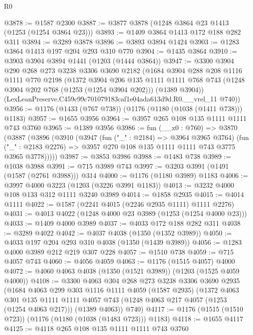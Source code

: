 \begin{lexlean}{R0}
\begin{coremodule}
@3878 := @1587 @2300
@3887 := @3877 @3878 (@1248 @3864 @23 @1413 (@1253 (@1254 @3864 @23)))
@3893 := @1409 @3864 @1413 @172 @188 @282 @311
@3894 := @3289 @3878
@3896 := @3893 @3894 @1424
@3903 := @1283 @3864 @1413 @197 @204 @293 @310 @770
@3904 := @1435 @3864
@3910 := @3903 @3904 @3894 @1441 (@1203 (@1444 @3864))
@3947 := @3300
    @3904
    @290
    @268
    @273
    @3238
    @3306
    @3690
    @2182
    (@1684
      @3904
      @288
      @208
      @1116
      @1111
      @770
      @2198
      (@1372
        @3904
        @206
        @135
        @1111
        @1111
        @768
        @743
        (@1248 @3904 @202 @768 (@1253 (@1254 @3904 @202)))
        (@1389 @3904))
      (LexLeanPreserve.C459c99c701079183caf1e04ada613d9d.R0.__vrel_11 @740))
@3956 := @1176 (@1433 (@767 @738)) (@1176 (@1180 (@1038 (@1411 @738))) @1183)
@3957 := @1655 @3956
@3964 := @3957 @265 @108 @135 @1111 @1111 @743 @3760
@3965 := @1389 @3956
@3986 := fun (__x0 : @760) =>
  @3870
    (@3887
      (@3896
        (@3910
          (@3947
            (fun ("_" : @2184) => @3964 @3965 @3764)
            (fun ("_" : @2183 @2276) => @3957 @270 @108 @135 @1111 @1111 @743 @3775 @3965 @3778)))))
@3987 := @3853 @3986
@3988 := @1483 @738
@3989 := @1038 @3988
@3991 := @715 @3989 @743
@3997 := @3203 @3991 (@1491 (@1587 (@2761 @3988))) @314
@4000 := @1176 (@1180 @3989) @1183
@4006 := @3997 @4000 @3223 (@1203 (@3226 @3991 @1183))
@4013 := @3232 @4000 @108 @133 @312 @1111 @3240 @3989
@4014 := @1858 @2935
@4015 := @4014 @1111
@4022 := @1587 (@2241 @4015 (@2246 @2935 @1111) @1111 @2276)
@4031 := @4013 @4022 (@1248 @4000 @23 @3989 (@1253 (@1254 @4000 @23)))
@4033 := @1409 @4000 @3989
@4037 := @4033 @172 @188 @282 @311
@4038 := @3289 @4022
@4042 := @4037 @4038 (@1350 (@1352 @3989))
@4050 := @4033 @197 @204 @293 @310 @4038 (@1350 (@1439 @3989))
@4056 := @1283 @4000 @3989 @212 @219 @307 @228
@4057 := @1510 @738
@4059 := @715 @4057 @743
@4060 := @4056 @4059
@4063 := @1176 (@1515 @4057) @4000
@4072 := @4060 @4063 @4038 (@1350 (@1521 @3989)) (@1203 (@1525 @4059 @4000))
@4108 := @3300
    @4063
    @304
    @268
    @273
    @3238
    @3306
    @3690
    @2935
    (@1684
      @4063
      @299
      @303
      @1116
      @1111
      @4059
      (@1587 @2935)
      (@1372
        @4063
        @301
        @135
        @1111
        @1111
        @4057
        @743
        (@1248 @4063 @217 @4057 (@1253 (@1254 @4063 @217)))
        (@1389 @4063))
      @740)
@4117 := @1176 (@1515 (@1510 @723)) (@1176 (@1180 (@1038 (@1483 @723))) @1183)
@4118 := @1655 @4117
@4125 := @4118 @265 @108 @135 @1111 @1111 @743 @3760

\end{coremodule}
\end{lexlean}
